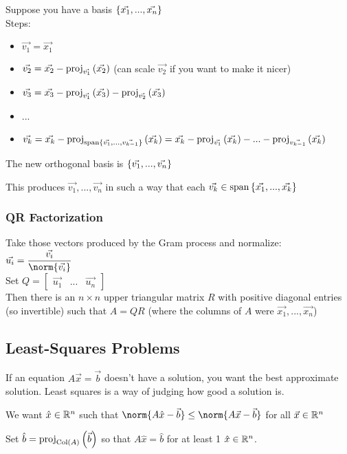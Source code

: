 Suppose you have a basis $\left\{\Vec{x_1}, ..., \Vec{x_n}\right\}$\\
Steps:
\begin{itemize}
    \item $\Vec{v_1} = \Vec{x_1}$
    \item $\Vec{v_2} = \Vec{x_2} - \mathrm{proj}_{\Vec{v_1}}\left(\Vec{x_2}\right)$ (can scale $\Vec{v_2}$ if you want to make it nicer)
    \item $\Vec{v_3} = \Vec{x_3} - \mathrm{proj}_{\Vec{v_1}}\left(\Vec{x_3}\right) - \mathrm{proj}_{\Vec{v_2}}\left(\Vec{x_3}\right)$
    \item ...
    \item $\Vec{v_k} = \Vec{x_k} - \mathrm{proj}_{\mathrm{span}\left\{\Vec{v_1}, ..., \Vec{v_{k-1}}\right\}}\left(\Vec{x_k}\right) = \Vec{x_k} - \mathrm{proj}_{\Vec{v_1}}\left(\Vec{x_k}\right) - ... - \mathrm{proj}_{\Vec{v_{k-1}}}\left(\Vec{x_k}\right)$
\end{itemize}
The new orthogonal basis is $\left\{\Vec{v_1}, ..., \Vec{v_n}\right\}$

This produces $\Vec{v_1}, ..., \Vec{v_n}$ in such a way that each $\Vec{v_k} \in \mathrm{span}\left\{\Vec{x_1}, ..., \Vec{x_k}\right\}$

\subsubsection*{QR Factorization}

Take those vectors produced by the Gram process and normalize: $\displaystyle \Vec{u_i} = \frac{\Vec{v_i}}{\norm{\Vec{v_i}}}$\\
Set $\displaystyle Q = \begin{bmatrix}\Vec{u_1} & ... & \Vec{u_n}\end{bmatrix}$\\
Then there is an $n \times n$ upper triangular matrix $R$ with positive diagonal entries (so invertible) such that $A = QR$ (where the columns of $A$ were $\Vec{x_1}, ..., \Vec{x_n}$)

\subsection{Least-Squares Problems}

If an equation $A\Vec x = \Vec b$ doesn't have a solution, you want the best approximate solution. Least squares is a way of judging how good a solution is.

We want $\hat{x} \in \mathbb{R}^n$ such that $\norm{A\hat x - \Vec b} \leq \norm{A\Vec x - \Vec b}$ for all $\Vec x \in \mathbb{R}^n$

Set $\displaystyle \hat b = \mathrm{proj}_{\operatorname{Col}(A)}\left(\Vec b\right)$ so that $A\hat x = \hat b$ for at least 1 $\hat x \in \mathbb{R}^n$.

